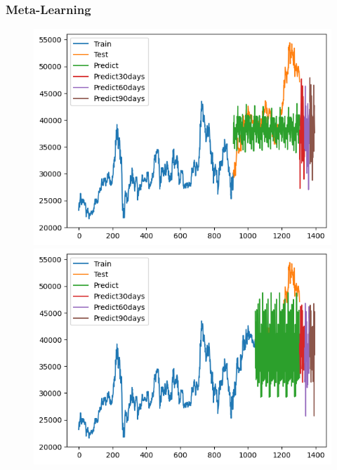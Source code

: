\subsubsection{Meta-Learning}
\begin{figure}[H]
    \centering
    \begin{minipage}{0.15\textwidth}
    \centering
    \includegraphics[width=1\textwidth]{resources/chapter-5/newdata1/result/BIDV_ML_7_3.png}
    \end{minipage}
    \hfill
    \begin{minipage}{0.15\textwidth}
    \centering
    \includegraphics[width=1\textwidth]{resources/chapter-5/newdata1/result/BIDV_ML_8_2.png}
    \end{minipage}
    \hfill
        \begin{minipage}{0.15\textwidth}

\end{minipage}
\end{figure}

